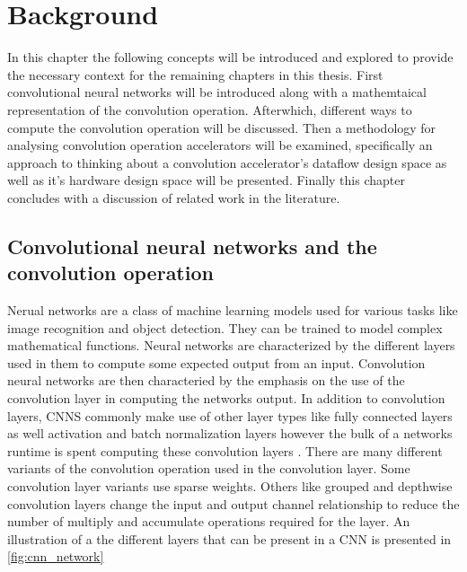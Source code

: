 \chapter{Background}
\label{chap:background:intro}

In this chapter the following concepts will be introduced and explored to
provide the necessary context for the remaining chapters in this thesis. First
convolutional neural networks will be introduced along with a mathemtaical
representation of the convolution operation. Afterwhich, different ways to
compute the convolution operation will be discussed. Then a methodology for
analysing convolution operation accelerators will be examined, specifically an
approach to thinking about a convolution accelerator's dataflow design space as
well as it's hardware design space will be presented. Finally this chapter
concludes with a discussion of related work in the literature. 


\clearpage

\section{Convolutional neural networks and the convolution operation}
\label{chap:background:cnns_and_conv}

Nerual networks are a class of machine learning models used for various tasks
like image recognition and object detection. They can be trained to model
complex mathematical functions. Neural networks are characterized by the
different layers used in them to compute some expected output from an input.
Convolution neural networks are then characteried by the emphasis on the use of
the convolution layer in computing the networks output. In addition to
convolution layers, CNNS commonly make use of other layer types like fully
connected layers as well activation and batch normalization layers
however the bulk of a networks runtime is spent computing these convolution
layers \cite{most_of_the_runtime}. There are many different variants of the
convolution operation used in the convolution layer. Some convolution layer
variants use sparse weights. Others like grouped and depthwise convolution
layers change the input and output channel relationship to reduce the number of
multiply and accumulate operations required for the layer. An illustration of a
the different layers that can be present in a CNN is presented in
\autoref{fig:cnn_network}

